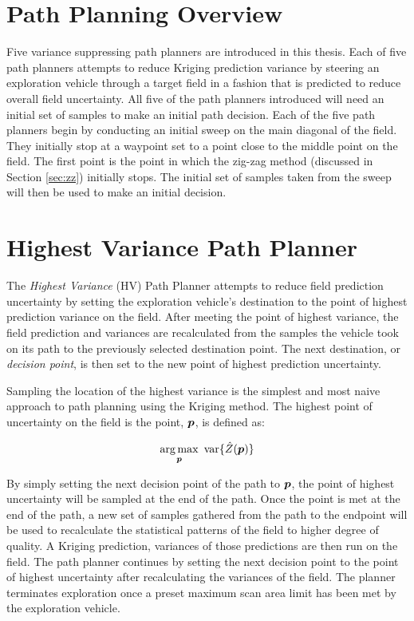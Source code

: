 \section{Path Planning Overview}
Five variance suppressing path planners are introduced in this thesis. Each of five path planners attempts to reduce Kriging prediction variance by steering an exploration vehicle through a target field in a fashion that is predicted to reduce overall field uncertainty. All five of the path planners introduced will need an initial set of samples to make an initial path decision. Each of the five path planners begin by conducting an initial sweep on the main diagonal of the field. They initially stop at a waypoint set to a point close to the middle point on the field. The first point is the point in which the zig-zag method (discussed in Section \ref{sec:zz}) initially stops. The initial set of samples taken from the sweep will then be used to make an initial decision.

\section{Highest Variance Path Planner} \label{sec:nhvpp}
The \textit{Highest Variance} (HV) Path Planner attempts to reduce field prediction uncertainty by setting the exploration vehicle's destination to the point of highest prediction variance on the field. After meeting the point of highest variance, the field prediction and variances are recalculated from the samples the vehicle took on its path to the previously selected destination point. The next destination, or \textit{decision point}, is then set to the new point of highest prediction uncertainty.

Sampling the location of the highest variance is the simplest and most naive approach to path planning using the Kriging method. The highest point of uncertainty on the field is the point, ${\it{\boldsymbol{p}}}$, is defined as:

\begin{equation}
\argmax_{\vect{p}} \ \text{var}\{\hat{Z}(\vect{p})\}
\end{equation}

By simply setting the next decision point of the path to ${\it{\boldsymbol{p}}}$, the point of highest uncertainty will be sampled at the end of the path. Once the point is met at the end of the path, a new set of samples gathered from the path to the endpoint will be used to recalculate the statistical patterns of the field to higher degree of quality. A Kriging prediction, variances of those predictions are then run on the field. The path planner continues by setting the next decision point to the point of highest uncertainty after recalculating the variances of the field. The planner terminates exploration once a preset maximum scan area limit has been met by the exploration vehicle.


